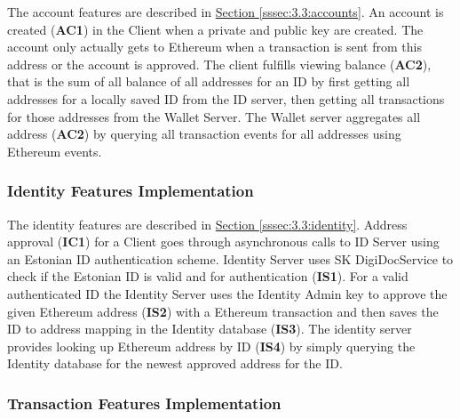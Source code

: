 \documentclass[a4paper,12pt]{article} %
\newcommand{\hypersectionref}[1]{\hyperref[#1]{Section \ref{#1}}}
\begin{document}
{The account features are described in \hypersectionref{sssec:3.3:accounts}. An account is created (\textbf{AC1}) in the Client when a private and public key are created. The account only actually gets to Ethereum when a transaction is sent from this address or the account is approved. The client fulfills viewing balance (\textbf{AC2}), that is the sum of all balance of all addresses for an ID by first getting all addresses for a locally saved ID from the ID server, then getting all transactions for those addresses from the Wallet Server. The Wallet server aggregates all address (\textbf{AC2}) by querying all transaction events for all addresses using Ethereum events.

\subsubsection{Identity Features Implementation} \label{sssec:3.6:identity}

The identity features are described in \hypersectionref{sssec:3.3:identity}. Address approval (\textbf{IC1}) for a Client goes through asynchronous calls to ID Server using an Estonian ID authentication scheme. Identity Server uses SK DigiDocService to check if the Estonian ID is valid and for authentication (\textbf{IS1}). For a valid authenticated ID the Identity Server uses the Identity Admin key to approve the given Ethereum address (\textbf{IS2}) with a Ethereum transaction and then saves the ID to address mapping in the Identity database (\textbf{IS3}). The identity server provides looking up Ethereum address by ID (\textbf{IS4}) by simply querying the Identity database for the newest approved address for the ID.

\subsubsection{Transaction Features Implementation} \label{sssec:3.6:transactions}

}
\end{document}
